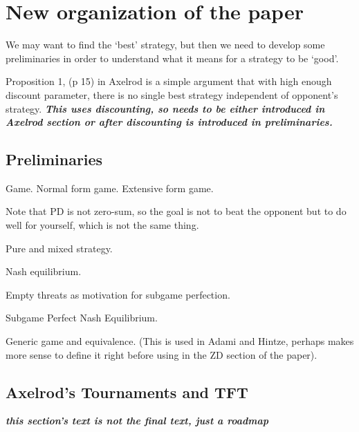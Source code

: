 \chapter{New organization of the paper}

We may want to find the `best' strategy, but then we need to develop some preliminaries in order to understand what it means for a strategy to be `good'.

Proposition 1, (p 15) in Axelrod is a simple argument that with high enough discount parameter, there is no single best strategy independent of opponent's strategy. \textit{\textbf{This uses discounting, so needs to be either introduced in Axelrod section or after discounting is introduced in preliminaries.}}

\section{Preliminaries}

\begin{definition}Game. Normal form game. Extensive form game.
\end{definition}

Note that PD is not zero-sum, so the goal is not to beat the opponent but to do well for yourself, which is not the same thing.

\begin{definition}Pure and mixed strategy.
\end{definition}

\begin{definition}Nash equilibrium.
\end{definition}

Empty threats as motivation for subgame perfection.

\begin{definition}Subgame Perfect Nash Equilibrium.
\end{definition}

\begin{definition}
Generic game and equivalence. (This is used in Adami and Hintze, perhaps makes more sense to define it right before using in the ZD section of the paper).
\end{definition}

\section{Axelrod's Tournaments and TFT}

\textit{\textbf{this section's text is not the final text, just a roadmap}}

